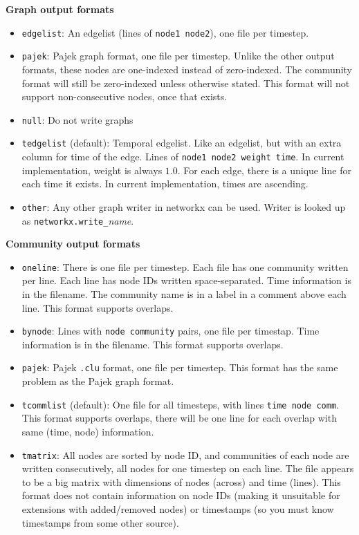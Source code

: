 \documentclass{article}
\begin{document}
\textbf{Graph output formats}
\begin{itemize}
\item \texttt{edgelist}: An edgelist (lines of \texttt{node1 node2}),
  one file per timestep.
\item \texttt{pajek}: Pajek graph format, one file per timestep.
  Unlike the other output formats, these nodes are one-indexed instead
  of zero-indexed.  The community format will still be zero-indexed
  unless otherwise stated.  This format will not support
  non-consecutive nodes, once that exists.
\item \texttt{null}: Do not write graphs
\item \texttt{tedgelist} (default): Temporal edgelist.  Like an edgelist, but
  with an extra column for time of the edge.  Lines of \texttt{node1
    node2 weight time}.  In current implementation, weight is always
  $1.0$.  For each edge, there is a unique line for each time it
  exists.  In current implementation, times are ascending.
\item \texttt{other}: Any other graph writer in networkx can be used.
  Writer is looked up as \texttt{networkx.write\_}\textsl{name}.
\end{itemize}

\textbf{Community output formats}
\begin{itemize}
\item \texttt{oneline}:  There is one file per timestep.  Each file
  has one community written per line.  Each line has node IDs written
  space-separated.  Time information is in the filename.  The
  community name is in a label in a comment above each line.  This
  format supports overlaps.
\item \texttt{bynode}: Lines with \texttt{node community} pairs,
  one file per timestap.  Time information is in the filename.  This
  format supports overlaps.
\item \texttt{pajek}: Pajek \texttt{.clu} format, one file per
  timestep.  This format has the same problem as the Pajek graph
  format.
\item \texttt{tcommlist} (default): One file for all timesteps, with
  lines \texttt{time node comm}.  This format supports overlaps, there
  will be one line for each overlap with same (time, node)
  information.
\item \texttt{tmatrix}: All nodes are sorted by node ID, and
  communities of each node are written consecutively, all nodes for
  one timestep on each line.  The file appears to be a big matrix with
  dimensions of nodes (across) and time (lines).  This format does not
  contain information on node IDs (making it unsuitable for extensions
  with added/removed nodes) or timestamps (so you must know timestamps
  from some other source).
\end{itemize}
\end{document}
